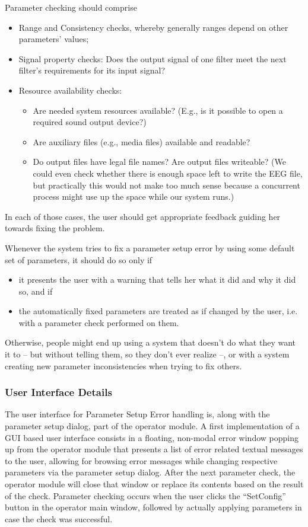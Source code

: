 \documentclass[12pt,a4paper]{article}
\begin{document}
Parameter checking should comprise
\begin{itemize}
  \item{Range and Consistency checks,}
        whereby generally ranges depend on other parameters' values;
  \item{Signal property checks:}
        Does the output signal of one filter meet the next filter's
        requirements for its input signal?
  \item{Resource availability checks:}
  \begin{itemize}  
    \item{Are needed system resources available?}
          (E.g., is it possible to open a required sound output device?)
    \item{Are auxiliary files (e.g., media files) available and readable?}
    \item{Do output files have legal file names? Are output files writeable?}
       (We could even check whether there is enough
       space left to write the EEG file, but practically this
       would not make too much sense because a concurrent process
       might use up the space while our system runs.)
  \end{itemize}
\end{itemize}

In each of those cases, the user should get appropriate
feedback guiding her towards fixing the problem.

Whenever the system tries to fix a parameter setup error
by using some default set of parameters, it should do so
only if
\begin{itemize}
\item it presents the user with a warning that tells her
what it did and why it did so, and if
\item the automatically fixed parameters are treated as if
changed by the user, i.e. with a parameter check performed
on them.
\end{itemize}
Otherwise, people might end up using a system that doesn't
do what they want it to -- but without telling them, so they
don't ever realize --, or with a system creating new parameter
inconsistencies when trying to fix others.

\subsubsection{User Interface Details}

The user interface for Parameter Setup Error handling is,
along with the parameter setup dialog, part of the operator
module. A first implementation of a GUI based user interface
consists in a floating, non-modal error window popping up from the operator
module that presents a list of error related textual
messages to the user, allowing for browsing error messages
while changing respective parameters via the parameter setup
dialog. After the next parameter check, the operator module will close
that window or replace its contents based on the result of the check.
Parameter checking occurs when the user clicks the ``SetConfig''
button in the operator main window, followed by actually applying
parameters in case the check was successful.
\end{document}
